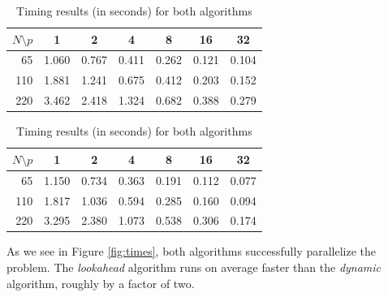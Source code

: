 \documentclass[letterpaper,twoside,11pt]{article}
\begin{document}
\begin{multicols}{2}
\begin{table}[H]
    \begin{subtable}{.5\textwidth}
      \centering
        \begin{tabular}{*{7}{r}}
        $ N \setminus p$ &   \multicolumn{1}{c}{\textbf{1}} &\multicolumn{1}{c}{\textbf{2}} &\multicolumn{1}{c}{\textbf{4}} &\multicolumn{1}{c}{\textbf{8}} &\multicolumn{1}{c}{\textbf{16}} &\multicolumn{1}{c}{\textbf{32}}\\
            \midrule
            65 & 1.060 & 0.767 & 0.411 & 0.262 & 0.121 & 0.104 \\
            110 & 1.881 & 1.241 & 0.675 & 0.412 & 0.203 & 0.152 \\
            220 & 3.462 & 2.418 & 1.324 & 0.682 & 0.388 & 0.279 \\
        \end{tabular}
        \caption{Times for the dynamic algorithm ($k = 12$)}
        \label{tab:Times_dynamic}
    \end{subtable}%

    \begin{subtable}{.5\textwidth}
      \centering
        \begin{tabular}{*{7}{r}}
        $ N \setminus p$ &   \multicolumn{1}{c}{\textbf{1}} &\multicolumn{1}{c}{\textbf{2}} &\multicolumn{1}{c}{\textbf{4}} &\multicolumn{1}{c}{\textbf{8}} &\multicolumn{1}{c}{\textbf{16}} &\multicolumn{1}{c}{\textbf{32}}\\
            \midrule
            65 & 1.150 & 0.734 & 0.363 & 0.191 & 0.112 & 0.077 \\
            110 & 1.817 & 1.036 & 0.594 & 0.285 & 0.160 & 0.094 \\
            220 & 3.295 & 2.380 & 1.073 & 0.538 & 0.306 & 0.174 \\
        \end{tabular}
        \caption{Times for the lookahead algorithm ($k = 12$)}
        \label{tab:Times_lookahead}
    \end{subtable}%

    \caption{Timing results (in seconds) for both algorithms }
    \label{tab:Times}
\end{table}




As we see in Figure \ref{fig:times}, both algorithms successfully parallelize the problem. The \emph{lookahead} algorithm runs on average faster than the \emph{dynamic} algorithm, roughly by a factor of two.


\end{multicols}
\end{document}
